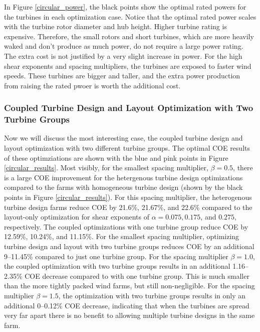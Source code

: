 In Figure \ref{circular_power}, the black points show the optimal rated powers for the turbines in each optimization case. Notice that the optimal rated power scales with the turbine rotor diameter and hub height. Higher turbine rating is expensive. Therefore, the small rotors and short turbines, which are more heavily waked and don't produce as much power, do not require a large power rating. The extra cost is not justified by a very slight increase in power. For the high shear exponents and spacing multipliers, the turbines are exposed to faster wind speeds. These turbines are bigger and taller, and the extra power production from raising the rated pwoer is worth the additional cost.



\subsubsection{Coupled Turbine Design and Layout Optimization with Two Turbine Groups}

Now we will discuss the most interesting case, the coupled turbine design and layout optimization with two different turbine groups. The optimal COE results of these optimziations are shown with the blue and pink points in Figure \ref{circular_results}. Most visibly, for the smallest spacing multiplier, $\beta=0.5$, there is a large COE improvement for the hetergenous turbine design optimizations compared to the farms with homogeneous turbine design (shown by the black points in Figure \ref{circular_results}). For this spacing multiplier, the heterogenous turbine design farms reduce COE by 21.6\%, 21.67\%, and 22.6\% compared to the layout-only optimization for shear exponents of $\alpha=0.075,0.175$, and $0.275$, respectively. The coupled optimizations with one turbine group reduce COE by 12.59\%, 10.24\%, and 11.15\%. For the smallest spacing multiplier, optimizing turbine design and layout with two turbine groups reduces COE by an additional 9--11.45\% compared to just one turbine group. For the spacing multiplier $\beta=1.0$, the coupled optimization with two turbine groups results in an additional 1.16--2.35\% COE decrease compared to with one turbine group. This is much smaller than the more tightly packed wind farms, but still non-negligible. For the spacing multiplier $\beta=1.5$, the optimization with two turbine groups results in only an additional 0--0.12\% COE decrease, indicating that when the turbines are spread very far apart there is no benefit to allowing multiple turbine designs in the same farm.

